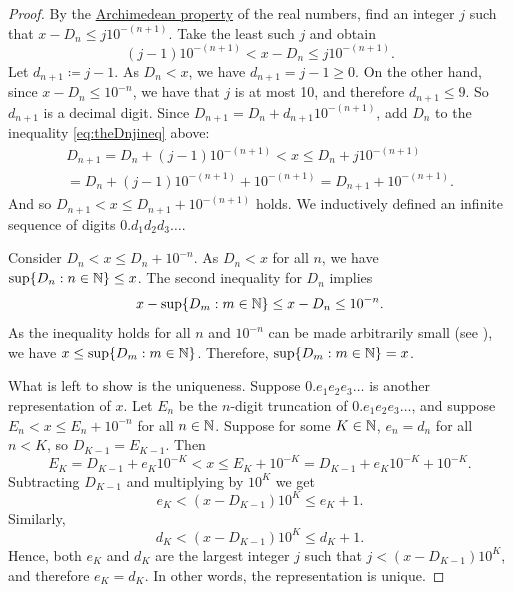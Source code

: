 \begin{proof}
By the
\hyperref[thm:arch:i]{Archimedean property} of the real numbers,
find an integer $j$ such that
$x-D_n \leq j {10}^{-(n+1)}$.  Take the least such $j$ and obtain
\begin{equation} \label{eq:theDnjineq}
(j-1){10}^{-(n+1)} < x-D_n \leq j {10}^{-(n+1)} .
\end{equation}
Let $d_{n+1} \coloneqq j-1$.
As $D_n < x$,
we have $d_{n+1} = j-1 \geq 0$.  On the other hand, since
$x-D_n \leq {10}^{-n}$, we have that
$j$ is at most 10, and therefore $d_{n+1} \leq 9$.
So $d_{n+1}$ is a
decimal digit.
Since $D_{n+1} = D_n + d_{n+1} {10}^{-(n+1)}$,
add $D_n$ to the inequality
\eqref{eq:theDnjineq} above:
\begin{multline*}
D_{n+1} = D_n + (j-1){10}^{-(n+1)} < x
\leq
D_n + j {10}^{-(n+1)} \\
=
D_n + (j-1) {10}^{-(n+1)} +
{10}^{-(n+1)} = D_{n+1} + {10}^{-(n+1)} .
\end{multline*}
And so
$D_{n+1} < x \leq D_{n+1} + {10}^{-(n+1)}$ holds.
We inductively
defined an infinite sequence of digits $0.d_1d_2d_3\ldots$.

Consider $D_{n} < x \leq D_{n} + {10}^{-n}$.
As $D_n < x$ for all $n$, we have
$\sup \{ D_n : n \in {\mathbb{N}} \} \leq x$.
The second inequality for $D_n$ implies
\begin{equation*}
x - \sup \{ D_m : m \in {\mathbb{N}} \}
\leq
x - D_n \leq 10^{-n} .
\end{equation*}
As the inequality holds for all $n$ and
${10}^{-n}$ can be made arbitrarily small
(see ),
we have $x \leq \sup \{ D_m : m \in {\mathbb{N}} \}$.
Therefore, $\sup \{ D_m : m \in {\mathbb{N}} \} = x$.

What is left to show is the uniqueness.
Suppose $0.e_1e_2e_3\ldots$ is another representation of $x$.
Let $E_n$ be the $n$-digit truncation of $0.e_1e_2e_3\ldots$, and suppose
$E_n < x \leq E_n + {10}^{-n}$ for all $n \in {\mathbb{N}}$.
Suppose for some $K \in {\mathbb{N}}$, $e_n = d_n$ for all $n < K$, so
$D_{K-1} = E_{K-1}$.  Then
\begin{equation*}
E_K = D_{K-1} + e_K{10}^{-K} < x \leq E_K + {10}^{-K} = D_{K-1} +
e_K{10}^{-K} + {10}^{-K} .
\end{equation*}
Subtracting $D_{K-1}$ and multiplying by ${10}^{K}$ we get
\begin{equation*}
e_K < (x - D_{K-1}){10}^K \leq e_K + 1 .
\end{equation*}
Similarly,
\begin{equation*}
d_K < (x - D_{K-1}){10}^K \leq d_K + 1 .
\end{equation*}
Hence, both $e_K$ and $d_K$ are the largest integer $j$
such that $j < (x - D_{K-1}){10}^K$, and therefore $e_K = d_K$.
In other words, the representation is unique.
\end{proof}

